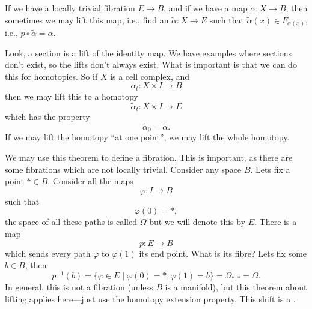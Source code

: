 \begin{thm}
If we have a locally trivial fibration $E\to B$, and if we have a
map $\alpha\colon X\to B$, then sometimes we may lift this map,
i.e., find an $\widetilde{\alpha}\colon X\to E$ such that
$\widetilde\alpha(x)\in F_{\alpha(x)}$, i.e.,
$p\circ\widetilde{\alpha}=\alpha$.
\end{thm}

Look, a section is a lift of the identity map. We have examples
where sections don't exist, so the lifts don't always exist. What
is important is that we can do this for homotopies. So if $X$ is
a cell complex, and 
\begin{equation}
\alpha_{t}\colon X\times I\to B
\end{equation}
then we may lift this to a homotopy
\begin{equation}
\widetilde{\alpha}_{t}\colon X\times I\to E
\end{equation}
which has the property
\begin{equation}
\widetilde{\alpha}_{0}=\widetilde{\alpha}.
\end{equation}
If we may lift the homotopy ``at one point'', we may lift the
whole homotopy. 

We may use this theorem to define a fibration. This is important,
as there are some fibrations which are not locally
trivial. Consider any space $B$. Lets fix a point $*\in
B$. Consider all the maps
\begin{equation}
\varphi\colon I\to B
\end{equation}
such that
\begin{equation}
\varphi(0)=*,
\end{equation}
the space of all these paths is called $\Omega$ but we will
denote this by $E$. There is a map 
\begin{equation}
p\colon E\to B
\end{equation}
which sends every path $\varphi$ to $\varphi(1)$ its end
point. What is its fibre? Lets fix some $b\in B$, then
\begin{equation}
p^{-1}(b)=\{\varphi\in E\mid \varphi(0)=*,\varphi(1)=b\} = \Omega_{*,*}=\Omega.
\end{equation}
In general, this is not a fibration (unless $B$ is a manifold),
but this theorem about lifting applies here---just use the
homotopy extension property. This shift is a .

